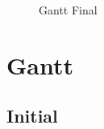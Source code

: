 \documentclass[12pt,a4paper]{book}
\begin{document}
\begin{landscape}
\begin{figure}[htp] 
	\caption{Gantt Final}
	\label{fig.gantt_final}
\end{figure}
\end{landscape}

\section{Gantt}

\subsection{Initial}
\end{document}
